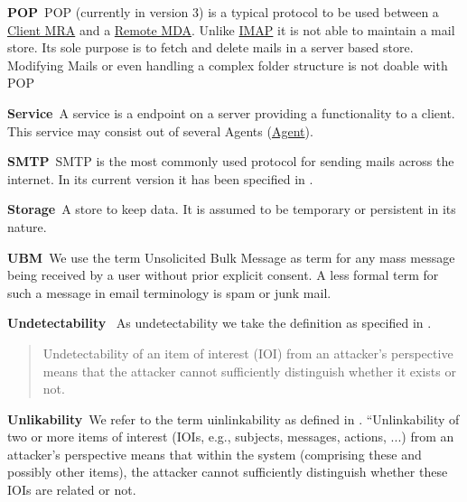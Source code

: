 \documentclass[a4paper,appendixprefix,pdfusetitle,twocolumn,fontsize=8pt,attachdocs,draft,status=draft]{scrbook}
\newenvironment{entry}{\par\leavevmode\hangpara{1.5mm}{1}\ignorespaces}{\RaggedRight\par}
\newcommand*{\mainentry}[2]{{\bfseries{#1\label{def:#1}}}~#2\par}
\newcommand*{\defref}[1]{\hyperref[def:#1]{#1}}
\begin{document}
\begin{entry}
  \mainentry{POP}{POP (currently in version 3) is a typical protocol to be used between a \defref{Client MRA} and a \defref{Remote MDA}. Unlike \defref{IMAP} it is not able to maintain a mail store. Its sole purpose is to fetch and delete mails in a server based store. Modifying Mails or even handling a complex folder structure is not doable with POP}
\end{entry}

\begin{entry}
  \mainentry{Service}{A service is a endpoint on a server providing a functionality to a client. This service may consist out of several Agents (\defref{Agent}).}
\end{entry}

\begin{entry}
  \mainentry{SMTP}{SMTP is the most commonly used protocol for sending mails across the internet. In its current version it has been specified in \cite{RFC5321}.}
\end{entry}

\begin{entry}
  \mainentry{Storage}{A store to keep data. It is assumed to be temporary or persistent in its nature.}
\end{entry}

\begin{entry}
	\mainentry{UBM}{We use the term Unsolicited Bulk Message as term for any mass message being received by a user without prior explicit consent. A less formal term for such a message in email terminology is spam or junk mail.}
\end{entry}

\begin{entry}
	\mainentry{Undetectability}{
		As undetectability we take the definition as specified in \cite{anon_terminology}.
		\begin{quote}
			Undetectability of an item of interest (IOI\index{Item of Interest}) from an attacker's perspective means that the
			attacker cannot sufficiently distinguish whether it exists or not.\omitted
		\end{quote}
	}
\end{entry}

\begin{entry}
  \mainentry{Unlikability}{We refer to the term uinlinkability as defined in \cite{anon_terminology}. ``Unlinkability of two or more items of interest (IOIs, e.g., subjects, messages, actions, ...) from an attacker’s perspective means that within the system (comprising these and possibly other items), the attacker cannot sufficiently distinguish whether these IOIs are 
  	related or not.}
\end{entry}
\end{document}
